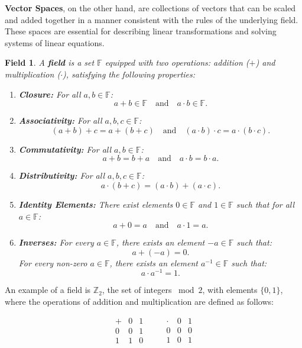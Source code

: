 \textbf{Vector Spaces}, on the other hand, are collections of vectors that can be scaled and added together in a manner consistent with the rules of the underlying field. These spaces are essential for describing linear transformations and solving systems of linear equations.

\newtheorem*{fld}{Field}
\begin{fld}
A \textbf{field} is a set $\mathbb{F}$ equipped with two operations: addition ($+$) and multiplication ($\cdot$), satisfying the following properties:

\begin{enumerate}
    \item \textbf{Closure:} For all $a, b \in \mathbb{F}$:
    \[
    a + b \in \mathbb{F} \quad \text{and} \quad a \cdot b \in \mathbb{F}.
    \]
    
    \item \textbf{Associativity:} For all $a, b, c \in \mathbb{F}$:
    \[
    (a + b) + c = a + (b + c) \quad \text{and} \quad (a \cdot b) \cdot c = a \cdot (b \cdot c).
    \]
    
    \item \textbf{Commutativity:} For all $a, b \in \mathbb{F}$:
    \[
    a + b = b + a \quad \text{and} \quad a \cdot b = b \cdot a.
    \]
    
    \item \textbf{Distributivity:} For all $a, b, c \in \mathbb{F}$:
    \[
    a \cdot (b + c) = (a \cdot b) + (a \cdot c).
    \]
    
    \item \textbf{Identity Elements:} There exist elements $0 \in \mathbb{F}$ and $1 \in \mathbb{F}$ such that for all $a \in \mathbb{F}$:
    \[
    a + 0 = a \quad \text{and} \quad a \cdot 1 = a.
    \]
    
    \item \textbf{Inverses:} For every $a \in \mathbb{F}$, there exists an element $-a \in \mathbb{F}$ such that:
    \[
    a + (-a) = 0.
    \]
    For every non-zero $a \in \mathbb{F}$, there exists an element $a^{-1} \in \mathbb{F}$ such that:
    \[
    a \cdot a^{-1} = 1.
    \]
\end{enumerate}
\end{fld}

An example of a field is $\mathbb{Z}_2$, the set of integers $\bmod 2$, with elements $\{0, 1\}$, where the operations of addition and multiplication are defined as follows:

\[
\begin{array}{c|cc}
+ & 0 & 1 \\
\hline
0 & 0 & 1 \\
1 & 1 & 0 \\
\end{array}
\quad \quad
\begin{array}{c|cc}
\cdot & 0 & 1 \\
\hline
0 & 0 & 0 \\
1 & 0 & 1 \\
\end{array}
\]


